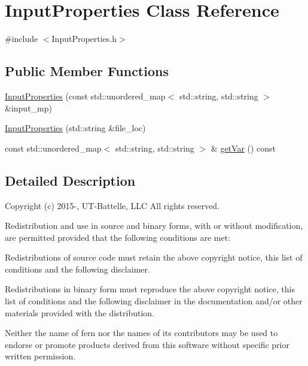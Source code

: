 \hypertarget{a00634}{}\section{Input\+Properties Class Reference}
\label{a00634}


{\ttfamily \#include $<$Input\+Properties.\+h$>$}

\subsection*{Public Member Functions}
\begin{DoxyCompactItemize}
\item 
\hyperlink{a00634_ae1f6838f54d0f129c117973d4604cbf9}{Input\+Properties} (const std\+::unordered\+\_\+map$<$ std\+::string, std\+::string $>$ \&input\+\_\+mp)
\item 
\hyperlink{a00634_a1eadd0414adf7b9cf3cb6caebdcafd19}{Input\+Properties} (std\+::string \&file\+\_\+loc)
\item 
const std\+::unordered\+\_\+map$<$ std\+::string, std\+::string $>$ \& \hyperlink{a00634_a8a7f30b41d879975f0366ad50b4a4743}{get\+Var} () const
\end{DoxyCompactItemize}


\subsection{Detailed Description}


 Copyright (c) 2015-\/, U\+T-\/\+Battelle, L\+LC All rights reserved.

Redistribution and use in source and binary forms, with or without modification, are permitted provided that the following conditions are met\+:

Redistributions of source code must retain the above copyright notice, this list of conditions and the following disclaimer.

Redistributions in binary form must reproduce the above copyright notice, this list of conditions and the following disclaimer in the documentation and/or other materials provided with the distribution.

Neither the name of fern nor the names of its contributors may be used to endorse or promote products derived from this software without specific prior written permission.

